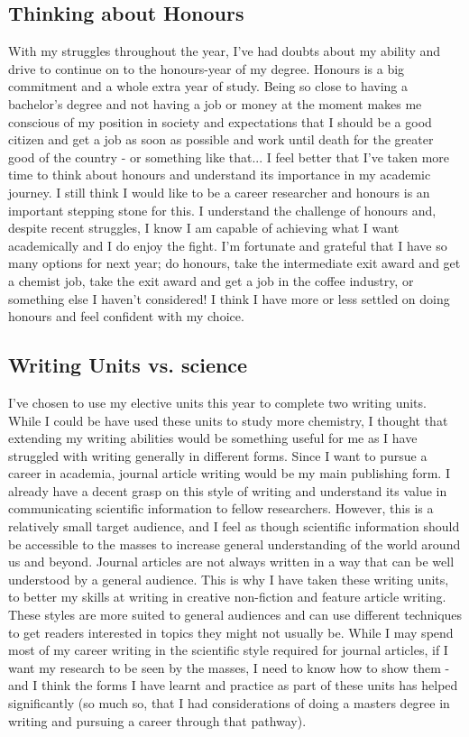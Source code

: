 \documentclass[11pt]{article}
\begin{document}
\subsection{Thinking about Honours}

With my struggles throughout the year, I've had doubts about my ability and drive to continue on to the honours-year of my degree. Honours is a big commitment and a whole extra year of study. Being so close to having a bachelor's degree and not having a job or money at the moment makes me conscious of my position in society and expectations that I should be a good citizen and get a job as soon as possible and work until death for the greater good of the country - or something like that... I feel better that I've taken more time to think about honours and understand its importance in my academic journey. I still think I would like to be a career researcher and honours is an important stepping stone for this. I understand the challenge of honours and, despite recent struggles, I know I am capable of achieving what I want academically and I do enjoy the fight. I'm fortunate and grateful that I have so many options for next year; do honours, take the intermediate exit award and get a chemist job, take the exit award and get a job in the coffee industry, or something else I haven't considered! I think I have more or less settled on doing honours and feel confident with my choice.

\subsection{Writing Units vs. science}

I've chosen to use my elective units this year to complete two writing units. While I could be have used these units to study more chemistry, I thought that extending my writing abilities would be something useful for me as I have struggled with writing generally in different forms. Since I want to pursue a career in academia, journal article writing would be my main publishing form. I already have a decent grasp on this style of writing and understand its value in communicating scientific information to fellow researchers. However, this is a relatively small target audience, and I feel as though scientific information should be accessible to the masses to increase general understanding of the world around us and beyond. Journal articles are not always written in a way that can be well understood by a general audience. This is why I have taken these writing units, to better my skills at writing in creative non-fiction and feature article writing. These styles are more suited to general audiences and can use different techniques to get readers interested in topics they might not usually be. While I may spend most of my career writing in the scientific style required for journal articles, if I want my research to be seen by the masses, I need to know how to show them - and I think the forms I have learnt and practice as part of these units has helped significantly (so much so, that I had considerations of doing a masters degree in writing and pursuing a career through that pathway).
\end{document}
